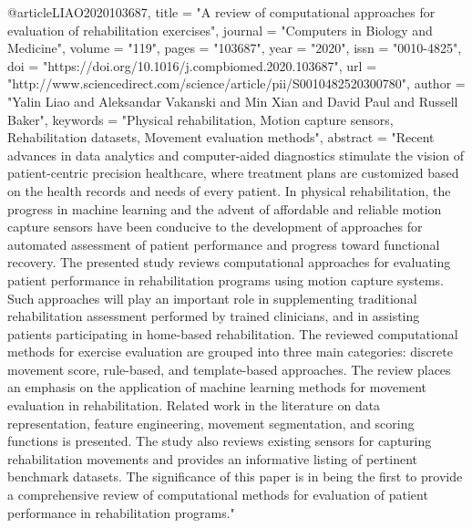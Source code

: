 @article{LIAO2020103687,
title = "A review of computational approaches for evaluation of rehabilitation exercises",
journal = "Computers in Biology and Medicine",
volume = "119",
pages = "103687",
year = "2020",
issn = "0010-4825",
doi = "https://doi.org/10.1016/j.compbiomed.2020.103687",
url = "http://www.sciencedirect.com/science/article/pii/S0010482520300780",
author = "Yalin Liao and Aleksandar Vakanski and Min Xian and David Paul and Russell Baker",
keywords = "Physical rehabilitation, Motion capture sensors, Rehabilitation datasets, Movement evaluation methods",
abstract = "Recent advances in data analytics and computer-aided diagnostics stimulate the vision of patient-centric precision healthcare, where treatment plans are customized based on the health records and needs of every patient. In physical rehabilitation, the progress in machine learning and the advent of affordable and reliable motion capture sensors have been conducive to the development of approaches for automated assessment of patient performance and progress toward functional recovery. The presented study reviews computational approaches for evaluating patient performance in rehabilitation programs using motion capture systems. Such approaches will play an important role in supplementing traditional rehabilitation assessment performed by trained clinicians, and in assisting patients participating in home-based rehabilitation. The reviewed computational methods for exercise evaluation are grouped into three main categories: discrete movement score, rule-based, and template-based approaches. The review places an emphasis on the application of machine learning methods for movement evaluation in rehabilitation. Related work in the literature on data representation, feature engineering, movement segmentation, and scoring functions is presented. The study also reviews existing sensors for capturing rehabilitation movements and provides an informative listing of pertinent benchmark datasets. The significance of this paper is in being the first to provide a comprehensive review of computational methods for evaluation of patient performance in rehabilitation programs."
}